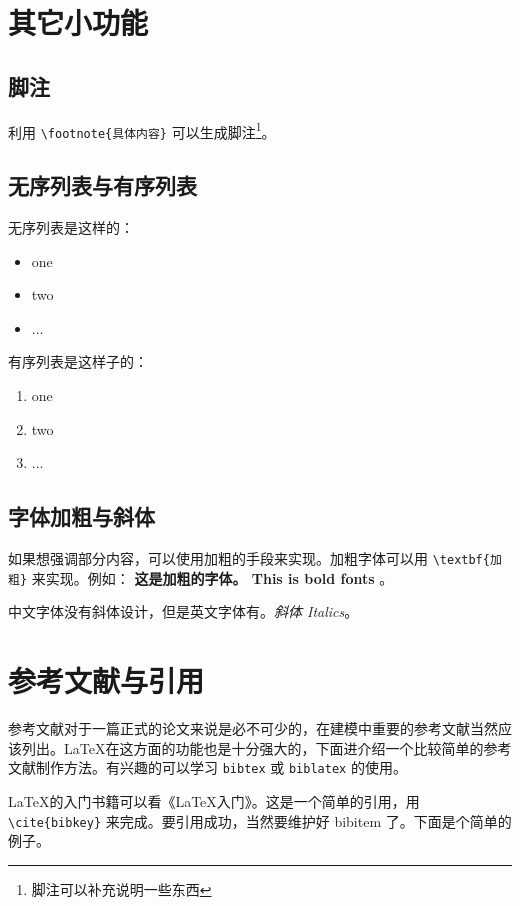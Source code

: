 \documentclass{cumcmthesis}
\begin{document}
\section{其它小功能}
\subsection{脚注}

利用 \verb|\footnote{具体内容}| 可以生成脚注\footnote{脚注可以补充说明一些东西}。

\subsection{无序列表与有序列表}

无序列表是这样的：
\begin{itemize}
    \item one
    \item two
    \item ...
\end{itemize}

有序列表是这样子的：
\begin{enumerate}
    \item one
    \item two
    \item ...
\end{enumerate}

\subsection{字体加粗与斜体}

如果想强调部分内容，可以使用加粗的手段来实现。加粗字体可以用 \verb|\textbf{加粗}| 来实现。例如： \textbf{这是加粗的字体。 This is bold fonts} 。

中文字体没有斜体设计，但是英文字体有。\textit{斜体 Italics}。

\section{参考文献与引用}

参考文献对于一篇正式的论文来说是必不可少的，在建模中重要的参考文献当然应该列出。\LaTeX{}在这方面的功能也是十分强大的，下面进介绍一个比较简单的参考文献制作方法。有兴趣的可以学习 \verb|bibtex| 或 \verb|biblatex| 的使用。

\LaTeX{}的入门书籍可以看《\LaTeX{}入门》\cite{liuhaiyang2013latex}。这是一个简单的引用，用 \verb|\cite{bibkey}| 来完成。要引用成功，当然要维护好 bibitem 了。下面是个简单的例子。
\end{document}
